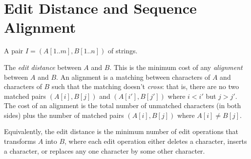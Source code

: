 \section{Edit Distance and Sequence Alignment}\label{dp: sec: edit distance}

\begin{mylist}
\item[\bf input:]
  A pair $I=(A[1..m], B[1..n])$ of strings.

\item[\bf output:]
  The \emph{edit distance} between $A$ and $B$.
  This is the minimum cost of any \emph{alignment}
  between $A$ and $B$.
  An alignment is a matching between characters of $A$
  and characters of $B$ such that the matching doesn't \emph{cross}:
  that is, there are no two matched pairs $(A[i], B[j])$ and $(A[i'], B[j'])$
  where $i < i'$ but $j > j'$.
  The cost of an alignment is the total number of unmatched characters (in both sides)
  plus the number of matched pairs $(A[i], B[j])$ where $A[i] \ne B[j]$.
\end{mylist}
Equivalently, the edit distance is the minimum number
of edit operations that transforms $A$ into $B$,
where each edit operation either deletes a character,
inserts a character, or replaces any one character by some other character.

